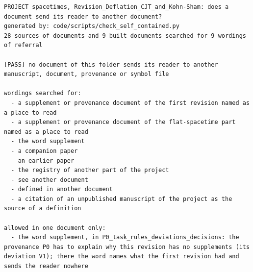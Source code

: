 \documentclass[
  10pt,
]{article}
\begin{document}
\begin{verbatim}
PROJECT spacetimes, Revision_Deflation_CJT_and_Kohn-Sham: does a document send its reader to another document?
generated by: code/scripts/check_self_contained.py
28 sources of documents and 9 built documents searched for 9 wordings of referral

[PASS] no document of this folder sends its reader to another manuscript, document, provenance or symbol file

wordings searched for:
  - a supplement or provenance document of the first revision named as a place to read
  - a supplement or provenance document of the flat-spacetime part named as a place to read
  - the word supplement
  - a companion paper
  - an earlier paper
  - the registry of another part of the project
  - see another document
  - defined in another document
  - a citation of an unpublished manuscript of the project as the source of a definition

allowed in one document only:
  - the word supplement, in P0_task_rules_deviations_decisions: the provenance P0 has to explain why this revision has no supplements (its deviation V1); there the word names what the first revision had and sends the reader nowhere


\end{verbatim}
\end{document}
